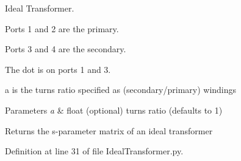 Ideal Transformer. 

Ports 1 and 2 are the primary.

Ports 3 and 4 are the secondary.

The dot is on ports 1 and 3.

a is the turns ratio specified as (secondary/primary) windings


\begin{DoxyParams}{Parameters}
{\em a} & float (optional) turns ratio (defaults to 1) \\
\hline
\end{DoxyParams}
\begin{DoxyReturn}{Returns}
the s-\/parameter matrix of an ideal transformer 
\end{DoxyReturn}


Definition at line 31 of file Ideal\+Transformer.\+py.

